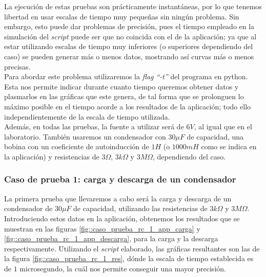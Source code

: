 \documentclass[../main.tex]{subfiles}
\begin{document}
La ejecución de estas pruebas son prácticamente instantáneas, por lo que tenemos libertad en usar escalas de tiempo muy pequeñas sin ningún problema. Sin embargo, esto puede dar problemas de precisión, pues el tiempo empleado en la simulación del \textit{script} puede ser que no coincida con el de la aplicación; ya que al estar utilizando escalas de tiempo muy inferiores (o superiores dependiendo del caso) se pueden generar más o menos datos, mostrando así curvas más o menos precisas. \\

Para abordar este problema utilizaremos la \textit{flag ``-t''} del programa en python. Esta nos permite indicar durante cuanto tiempo queremos obtener datos y plasmarlos en las gráficas que este genera, de tal forma que se prolonguen lo máximo posible en el tiempo acorde a los resultados de la aplicación; todo ello independientemente de la escala de tiempo utilizada.\\ 




Además, en todas las pruebas, la fuente a utilizar será de $6V$, al igual que en el laboratorio. También usaremos un condensador con $30 \mu F$ de capacidad, una bobina con un coeficiente de autoinducción de $1H$ (o $1000mH$ como se indica en la aplicación) y resistencias de $3\Omega$, $3k \Omega$ y $3M \Omega$, dependiendo del caso. 



\subsubsection{Caso de prueba 1: carga y descarga de un condensador}
La primera prueba que llevaremos a cabo será la carga y descarga de un condensador de $30 \mu F$ de capacidad, utilizando las resistencias de $3k\Omega$ y $3M\Omega$. \\

Introduciendo estos datos en la aplicación, obtenemos los resultados que se muestran en las figuras \ref{fig::caso_prueba_rc_1_app_carga} y \ref{fig::caso_prueba_rc_1_app_descarga}, para la carga y la descarga respectivamente. Utilizando el \textit{script} elaborado, las gráficas resultantes son las de la figura \ref{fig::caso_prueba_rc_1_res}, dónde la escala de tiempo establecida es de $1$ microsegundo, la cuál nos permite conseguir una mayor precisión.\\
\end{document}
